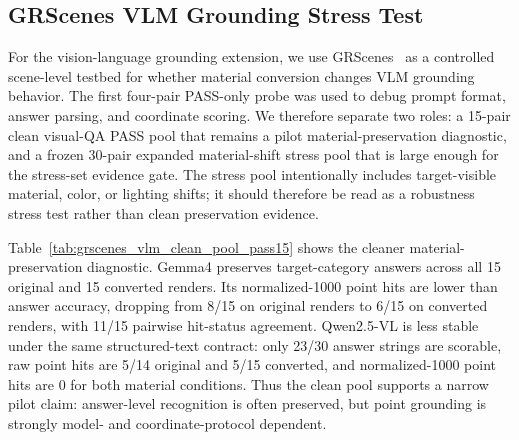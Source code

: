 \subsection{GRScenes VLM Grounding Stress Test}
\label{sec:vlm_grounding_pilot}

For the vision-language grounding extension, we use
GRScenes~\cite{Wang2024GRUtopia} as a controlled scene-level testbed for
whether material conversion changes VLM grounding behavior. The
first four-pair PASS-only probe was used to debug prompt format, answer
parsing, and coordinate scoring. We therefore separate two roles: a 15-pair
clean visual-QA PASS pool that remains a pilot material-preservation diagnostic,
and a frozen 30-pair expanded material-shift stress pool that is large enough
for the stress-set evidence gate. The stress pool intentionally includes
target-visible material, color, or lighting shifts; it should therefore be read
as a robustness stress test rather than clean preservation evidence.



Table~\ref{tab:grscenes_vlm_clean_pool_pass15} shows the cleaner
material-preservation diagnostic. Gemma4 preserves target-category answers
across all 15 original and 15 converted renders. Its normalized-1000 point hits
are lower than answer accuracy, dropping from 8/15 on original renders to 6/15
on converted renders, with 11/15 pairwise hit-status agreement. Qwen2.5-VL is
less stable under the same structured-text contract: only 23/30 answer strings
are scorable, raw point hits are 5/14 original and 5/15 converted, and
normalized-1000 point hits are 0 for both material conditions. Thus the clean
pool supports a narrow pilot claim: answer-level recognition is often preserved, but
point grounding is strongly model- and coordinate-protocol dependent.



